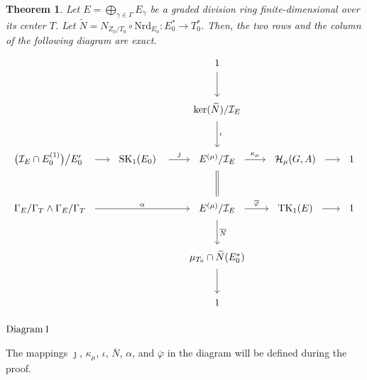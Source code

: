 \documentclass[11pt]{article}
\numberwithin{equation}{section}
\theoremstyle{plain}
\newtheorem{theorem}{Theorem}[section]
\theoremstyle{remark}
\newcommand{\ov}{\overline}
\begin{document}
\begin{theorem}
\label{thm:graded-tk1-diagram}
Let $  E = \bigoplus_{\gamma \in \Gamma} E_\gamma  $ be a graded division ring finite-dimensional over its 
center $  T  $. 
Let  $\widetilde{N}=N_{Z_0/T_0}\circ \mathrm{Nrd}_{E_0}:E_0^*\to T_0^*$. 
Then, the two rows and the column of the following diagram are exact.  
\begin{equation*}
\begin{tikzcd}[
  column sep=1.5em,
  row sep=2.5em,
  ampersand replacement=\&,
  cells={nodes={inner sep=6pt}}
]
\& \& 1 \arrow[d] \\
\& \& \ker(\widetilde{N})/\mathcal I_E \arrow[d, "\scriptstyle\iota"] \\
\big(\mathcal I_E\cap E_0^{(1)}\big)\big/E_0' \  \arrow[r]\ 
\& \ \mathrm{SK}_1(E_0) \ \arrow[r, "\scriptstyle\jmath"]\ 
\& \ E^{(\mu)}/\mathcal I_E\ 
    \arrow[r, "\scriptstyle\kappa_\mu"]
    \arrow[d, equal]
\& \ \mathcal H_{\mu}(G,A)\  \arrow[r]
\& \ 1 \\
\Gamma_E/\Gamma_T \wedge \Gamma_E/\Gamma_T\ 
  \arrow[rr, "\scriptstyle\alpha"]
\& \&
\ E^{(\mu)}/\mathcal I_E\ 
  \arrow[r, "\scriptstyle\overline{\varphi}"]
  \arrow[d, "\scriptstyle\overline{N}"]
\& \ \mathrm{TK}_1(E)\  \arrow[r]
\& \ 1 \\
\& \& \mu_{T_0} \cap \widetilde{N}(E_0^*) \arrow[d] \\
\& \& 1
\end{tikzcd}
\end{equation*}
\begin{center}
{$\text{Diagram\,1}$}
\end{center}
\end{theorem}

The mappings  $\jmath$, $\kappa_\mu$, $\iota$, $\ov N$, $\alpha$,   and $\ov{\varphi}$ in the diagram will be defined 
during the proof.
\end{document}
